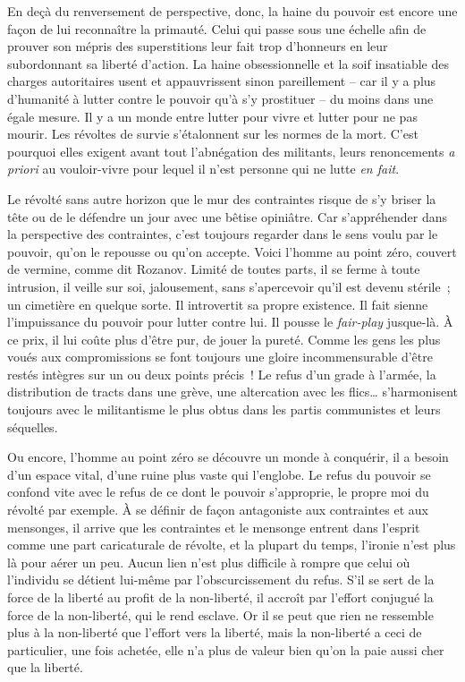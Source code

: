 \documentclass[french,twoside]{book} %
\begin{document}
En deçà du renversement de perspective, donc, la haine du pouvoir est encore une façon de lui reconnaître la primauté. Celui qui passe sous une échelle afin de prouver son mépris des superstitions leur fait trop d’honneurs en leur subordonnant sa liberté d’action. La haine obsessionnelle et la soif insatiable des charges autoritaires usent et appauvrissent sinon pareillement – car il y a plus d’humanité à lutter contre le pouvoir qu’à s’y prostituer – du moins dans une égale mesure. Il y a un monde entre lutter pour vivre et lutter pour ne pas mourir. Les révoltes de survie s’étalonnent sur les normes de la mort. C’est pourquoi elles exigent avant tout l’abnégation des militants, leurs renoncements \emph{a priori} au vouloir-vivre pour lequel il n’est personne qui ne lutte \emph{en fait}.\par
Le révolté sans autre horizon que le mur des contraintes risque de s’y briser la tête ou de le défendre un jour avec une bêtise opiniâtre. Car s’appréhender dans la perspective des contraintes, c’est toujours regarder dans le sens voulu par le pouvoir, qu’on le repousse ou qu’on accepte. Voici l’homme au point zéro, couvert de vermine, comme dit Rozanov. Limité de toutes parts, il se ferme à toute intrusion, il veille sur soi, jalousement, sans s’apercevoir qu’il est devenu stérile ; un cimetière en quelque sorte. Il introvertit sa propre existence. Il fait sienne l’impuissance du pouvoir pour lutter contre lui. Il pousse le \emph{fair-play} jusque-là. À ce prix, il lui coûte plus d’être pur, de jouer la pureté. Comme les gens les plus voués aux compromissions se font toujours une gloire incommensurable d’être restés intègres sur un ou deux points précis ! Le refus d’un grade à l’armée, la distribution de tracts dans une grève, une altercation avec les flics… s’harmonisent toujours avec le militantisme le plus obtus dans les partis communistes et leurs séquelles.\par
Ou encore, l’homme au point zéro se découvre un monde à conquérir, il a besoin d’un espace vital, d’une ruine plus vaste qui l’englobe. Le refus du pouvoir se confond vite avec le refus de ce dont le pouvoir s’approprie, le propre moi du révolté par exemple. À se définir de façon antagoniste aux contraintes et aux mensonges, il arrive que les contraintes et le mensonge entrent dans l’esprit comme une part caricaturale de révolte, et la plupart du temps, l’ironie n’est plus là pour aérer un peu. Aucun lien n’est plus difficile à rompre que celui où l’individu se détient lui-même par l’obscurcissement du refus. S’il se sert de la force de la liberté au profit de la non-liberté, il accroît par l’effort conjugué la force de la non-liberté, qui le rend esclave. Or il se peut que rien ne ressemble plus à la non-liberté que l’effort vers la liberté, mais la non-liberté a ceci de particulier, une fois achetée, elle n’a plus de valeur bien qu’on la paie aussi cher que la liberté.\par
\end{document}

